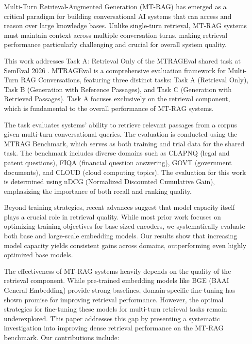 \documentclass[11pt]{article}
\begin{document}
Multi-Turn Retrieval-Augmented Generation (MT-RAG) has emerged as a critical paradigm for building conversational AI systems that can access and reason over large knowledge bases. Unlike single-turn retrieval, MT-RAG systems must maintain context across multiple conversation turns, making retrieval performance particularly challenging and crucial for overall system quality.

This work addresses Task A: Retrieval Only of the MTRAGEval shared task at SemEval 2026 \cite{mtreval2026}. MTRAGEval is a comprehensive evaluation framework for Multi-Turn RAG Conversations, featuring three distinct tasks: Task A (Retrieval Only), Task B (Generation with Reference Passages), and Task C (Generation with Retrieved Passages). Task A focuses exclusively on the retrieval component, which is fundamental to the overall performance of MT-RAG systems. 

The task evaluates systems' ability to retrieve relevant passages from a corpus given multi-turn conversational queries. The evaluation is conducted using the MTRAG Benchmark, which serves as both training and trial data for the shared task. The benchmark includes diverse domains such as CLAPNQ (legal and patent questions), FIQA (financial question answering), GOVT (government documents), and CLOUD (cloud computing topics). The evaluation for this work is determined using nDCG (Normalized Discounted Cumulative Gain), emphasizing the importance of both recall and ranking quality. 

Beyond training strategies, recent advances suggest that model capacity itself plays a crucial role in retrieval quality. While most prior work focuses on optimizing training objectives for base-sized encoders, we systematically evaluate both base and large-scale embedding models. Our results show that increasing model capacity yields consistent gains across domains, outperforming even highly optimized base models.

The effectiveness of MT-RAG systems heavily depends on the quality of the retrieval component. While pre-trained embedding models like BGE (BAAI General Embedding) provide strong baselines, domain-specific fine-tuning has shown promise for improving retrieval performance. However, the optimal strategies for fine-tuning these models for multi-turn retrieval tasks remain underexplored. This paper addresses this gap by presenting a systematic investigation into improving dense retrieval performance on the MT-RAG benchmark. Our contributions include:
\end{document}
